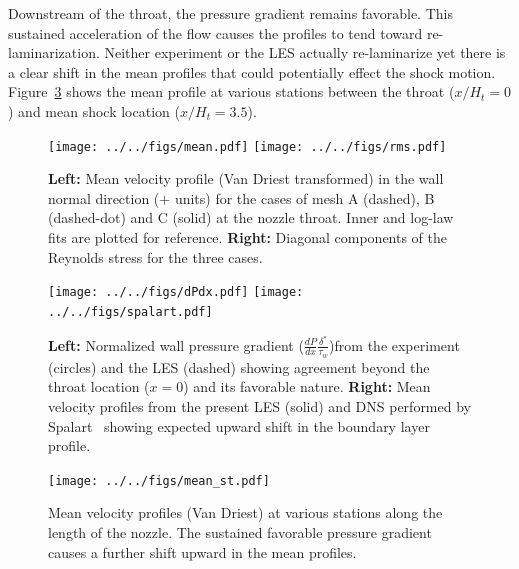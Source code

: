 \documentclass[]{aiaa-tc}%
\begin{document}




Downstream of the throat, the pressure gradient remains favorable.  This sustained acceleration of the flow causes the profiles to tend toward re-laminarization.  Neither experiment or the LES actually re-laminarize yet there is a clear shift in the mean profiles that could potentially effect the shock motion.  Figure~\ref{fig:stations} shows the mean profile at various stations between the throat ($x/H_t=0$) and mean shock location ($x/H_t=3.5$).


\begin{figure}[!ht]
	\texttt{[image: ../../figs/mean.pdf]}
	\texttt{[image: ../../figs/rms.pdf]}
	\caption{ {\bf Left:} Mean velocity profile (Van Driest transformed) in the wall normal direction ($+$ units) for the cases of mesh A (dashed), B (dashed-dot) and C (solid) at the nozzle throat.  Inner and log-law fits are plotted for reference.  {\bf Right:} Diagonal components of the Reynolds stress for the three cases.
	\label{fig:BL_prof}
	}
\end{figure}


\begin{figure}[!ht]
	\texttt{[image: ../../figs/dPdx.pdf]}
	\texttt{[image: ../../figs/spalart.pdf]}
	\caption{ {\bf Left:} Normalized wall pressure gradient ($\frac{dP}{dx} \frac{\delta^*}{\tau_w}$)from the experiment (circles) and the LES (dashed) showing agreement beyond the throat location ($x=0$) and its favorable nature.  {\bf Right:} Mean velocity profiles from the present LES (solid) and DNS performed by Spalart~\cite{Spalart:93} showing expected upward shift in the boundary layer profile.
 	\label{fig:dPdx}
	}
\end{figure}



\begin{figure}[!ht]
	\begin{centering}
	\texttt{[image: ../../figs/mean\_st.pdf]}

	\caption{ Mean velocity profiles (Van Driest) at various stations along the length of the nozzle.  The sustained favorable pressure gradient causes a further shift upward in the mean profiles.
 	\label{fig:stations}
	}
	\end{centering}
\end{figure}


\clearpage
\end{document}
